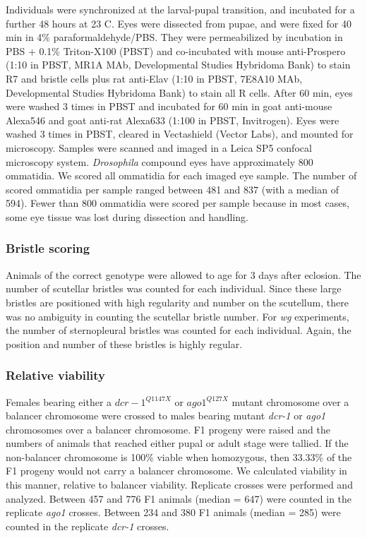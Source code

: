 Individuals were synchronized at the larval-pupal transition, and incubated for a further 48 hours at 23 \textdegree{}C. Eyes were dissected from pupae, and were fixed for 40 min in 4\% paraformaldehyde/PBS. They were permeabilized by incubation in PBS + 0.1\% Triton-X100 (PBST) and co-incubated with mouse anti-Prospero (1:10 in PBST, MR1A MAb, Developmental Studies Hybridoma Bank) to stain R7 and bristle cells plus rat anti-Elav (1:10 in PBST, 7E8A10 MAb, Developmental Studies Hybridoma Bank) to stain all R cells. After 60 min, eyes were washed 3 times in PBST and incubated for 60 min in goat anti-mouse Alexa546 and goat anti-rat Alexa633 (1:100 in PBST, Invitrogen). Eyes were washed 3 times in PBST, cleared in Vectashield (Vector Labs), and mounted for microscopy. Samples were scanned and imaged in a Leica SP5 confocal microscopy system. \textit{Drosophila} compound eyes have approximately 800 ommatidia. We scored all ommatidia for each imaged eye sample. The number of scored ommatidia per sample ranged between 481 and 837 (with a median of 594). Fewer than 800 ommatidia were scored per sample because in most cases, some eye tissue was lost during dissection and handling.

\subsubsection{Bristle scoring}

Animals of the correct genotype were allowed to age for 3 days after eclosion. The number of scutellar bristles was counted for each individual. Since these large bristles are positioned with high regularity and number on the scutellum, there was no ambiguity in counting the scutellar bristle number. For \textit{wg} experiments, the number of sternopleural bristles was counted for each individual. Again, the position and number of these bristles is highly regular.

\subsubsection{Relative viability}

Females bearing either a $dcr-1^{Q1147X}$ or $ago1^{Q127X}$ mutant chromosome over a balancer chromosome were crossed to males bearing mutant \textit{dcr-1} or \textit{ago1} chromosomes over a balancer chromosome. F1 progeny were raised and the numbers of animals that reached either pupal or adult stage were tallied. If the non-balancer chromosome is 100\% viable when homozygous, then 33.33\% of the F1 progeny would not carry a balancer chromosome. We calculated viability in this manner, relative to balancer viability. Replicate crosses were performed and analyzed. Between 457 and 776 F1 animals (median = 647) were counted in the replicate \textit{ago1} crosses. Between 234 and 380 F1 animals (median = 285) were counted in the replicate \textit{dcr-1} crosses.

